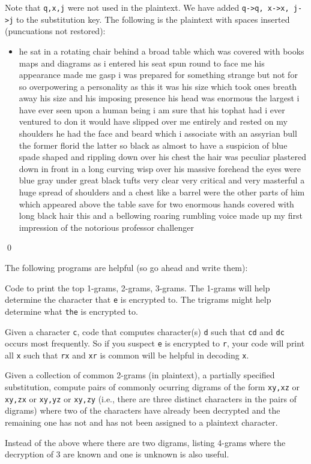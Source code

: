 Note that \verb!q,x,j! were not used in the plaintext.
We have added \verb!q->q, x->x, j->j! to the substitution key.
The following is the plaintext with spaces inserted (puncuations not restored):
\begin{itemize}
  \item[]
he sat in a rotating chair behind a broad table which was covered with books maps and diagrams
as i entered his seat spun round to face me his appearance made me gasp i was prepared for
something strange but not for so overpowering a personality
as this it was his size which took ones breath away his size and his imposing presence
his head was enormous the largest i have ever seen upon a human being i am sure that his
tophat had i ever ventured to
don it would have slipped over me entirely
and rested on my shoulders
he had the face and beard which i associate
with an assyrian bull the former
florid the latter
so
black as
almost to have a suspicion of blue spade shaped and rippling down
over his chest the hair was peculiar plastered
down in front in a long curving wisp over his massive forehead
the eyes were blue gray under great black tufts very
clear very critical and very masterful
a huge spread of shoulders and a chest like a barrel
were the other parts of him which
appeared above the table save for two enormous hands
covered with long black hair this and a bellowing roaring
rumbling voice made up my first impression of the notorious professor
challenger
\end{itemize}
\qed

The following programs are helpful (so go ahead and write them):
\begin{myenum}
\item Code to print the top 1-grams, 2-grams, 3-grams.
  The 1-grams will help determine the character that \verb!e! is encrypted to.
  The trigrams might help determine what \verb!the! is encrypted to.
\item Given a character \verb!c!, code that computes character(s) \verb!d!
  such that \verb!cd! and \verb!dc! occurs most frequently.
  So if you suspect \verb!e! is encrypted to \verb!r!,
  your code will print all \verb!x! such that \verb!rx! and \verb!xr! is common
  will be helpful in decoding \verb!x!.
\item Given a collection of common 2-grams (in plaintext), a
  partially specified substitution,
  compute pairs of commonly ocurring digrams
  of the form \verb!xy,xz! or \verb!xy,zx! or \verb!xy,yz! or \verb!xy,zy!
  (i.e., there are three distinct characters in the pairs of digrams)
  where two of the characters have already been decrypted and the remaining
  one has not and has not been assigned to a plaintext character.
\item Instead of the above where there are two digrams, listing 4-grams
  where the decryption of 3 are known and one is unknown is also 
  useful.
\end{myenum}


